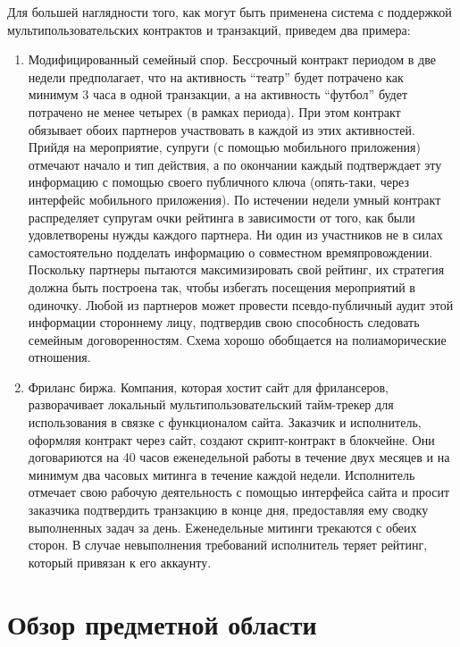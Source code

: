 \documentclass[]{itmo-student-thesis}
\begin{document}
Для большей наглядности того, как могут быть применена система с
поддержкой мультипользовательских контрактов и транзакций, приведем
два примера:

\begin{enumerate}
  \item Модифицированный семейный спор. Бессрочный контракт периодом в
    две недели предполагает, что на активность ``театр'' будет
    потрачено как минимум 3 часа в одной транзакции, а на активность
    ``футбол'' будет потрачено не менее четырех (в рамках
    периода). При этом контракт обязывает обоих партнеров участвовать
    в каждой из этих активностей. Прийдя на мероприятие, супруги (с
    помощью мобильного приложения) отмечают начало и тип действия, а
    по окончании каждый подтверждает эту информацию с помощью своего
    публичного ключа (опять-таки, через интерфейс мобильного
    приложения). По истечении недели умный контракт распределяет
    супругам очки рейтинга в зависимости от того, как были
    удовлетворены нужды каждого партнера. Ни один из участников не в
    силах самостоятельно подделать информацию о совместном
    времяпровождении. Поскольку партнеры пытаются максимизировать свой
    рейтинг, их стратегия должна быть построена так, чтобы избегать
    посещения мероприятий в одиночку. Любой из партнеров может
    провести псевдо-публичный аудит этой информации стороннему лицу,
    подтвердив свою способность следовать семейным
    договоренностям. Схема хорошо обобщается на полиаморические
    отношения.
  \item Фриланс биржа. Компания, которая хостит сайт для фрилансеров,
    разворачивает локальный мультипользовательский тайм-трекер для
    использования в связке с функционалом сайта. Заказчик и
    исполнитель, оформляя контракт через сайт, создают скрипт-контракт
    в блокчейне. Они договариются на 40 часов еженедельной работы в
    течение двух месяцев и на минимум два часовых митинга в течение
    каждой недели. Исполнитель отмечает свою рабочую деятельность с
    помощью интерфейса сайта и просит заказчика подтвердить транзакцию
    в конце дня, предоставляя ему сводку выполненных задач за
    день. Еженедельные митинги трекаются с обеих сторон. В случае
    невыполнения требований исполнитель теряет рейтинг, который
    привязан к его аккаунту.
\end{enumerate}

\chapter{Обзор предметной области}
\end{document}
